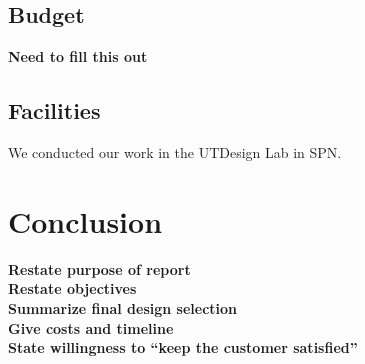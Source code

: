 \documentclass[letterpaper,12pt]{article}
\newcommand{\xxx}[1]{{\color{red}\bf #1}}
\begin{document}
\subsection{Budget}
\xxx{Need to fill this out}

\subsection{Facilities}
We conducted our work in the UTDesign Lab in SPN.

\section{Conclusion}
\label{sec:conclusion}

\xxx{Restate purpose of report} \\
\xxx{Restate objectives} \\
\xxx{Summarize final design selection} \\
\xxx{Give costs and timeline} \\
\xxx{State willingness to ``keep the customer satisfied''}
\end{document}

